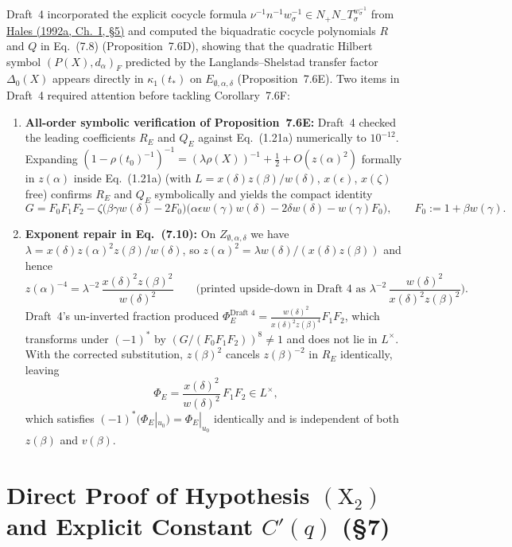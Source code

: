 \documentclass[11pt,letterpaper]{article}
\begin{document}
Draft~4 incorporated the explicit cocycle formula $\nu^{-1}n^{-1}w_\sigma^{-1}\in N_+N_-T_\sigma^{w_\sigma^{-1}}$ from \href{https://iacobus.usc.gal/nde/fulldisplay/alma991013513907807712/34CISUG_USC:NDE/gl}{Hales (1992a, Ch.~I, \S5)} \cite{Ha92a} and computed the biquadratic cocycle polynomials $R$ and $Q$ in Eq.~(7.8) (Proposition~7.6D), showing that the quadratic Hilbert symbol $(P(X),d_\alpha)_F$ predicted by the Langlands--Shelstad transfer factor $\Delta_0(X)$ appears directly in $\kappa_1(t_*)$ on $E_{\emptyset,\alpha,\delta}$ (Proposition~7.6E). Two items in Draft~4 required attention before tackling Corollary~7.6F:
\begin{enumerate}[1.]
\item \textbf{All-order symbolic verification of Proposition~7.6E:} Draft~4 checked the leading coefficients $R_E$ and $Q_E$ against Eq.~(1.21a) numerically to $10^{-12}$. Expanding $(1-\rho(t_0)^{-1})^{-1}=(\lambda\rho(X))^{-1}+\tfrac12+O(z(\alpha)^2)$ formally in $z(\alpha)$ inside Eq.~(1.21a) (with $L=x(\delta)z(\beta)/w(\delta)$, $x(\epsilon)$, $x(\zeta)$ free) confirms $R_E$ and $Q_E$ symbolically and yields the compact identity
\[
G=F_0F_1F_2-\zeta\bigl(\beta\gamma w(\delta)-2F_0\bigr)\bigl(\alpha\epsilon w(\gamma)w(\delta)-2\delta w(\delta)-w(\gamma)F_0\bigr),\qquad F_0:=1+\beta w(\gamma).
\]
\item \textbf{Exponent repair in Eq.~(7.10):} On $Z_{\emptyset,\alpha,\delta}$ we have $\lambda=x(\delta)z(\alpha)^2z(\beta)/w(\delta)$, so $z(\alpha)^2=\lambda w(\delta)/(x(\delta)z(\beta))$ and hence
\[
z(\alpha)^{-4}=\lambda^{-2}\,\frac{x(\delta)^2z(\beta)^2}{w(\delta)^2}
\qquad\text{(printed upside-down in Draft~4 as }\lambda^{-2}\,\frac{w(\delta)^2}{x(\delta)^2z(\beta)^2}\text{)}.
\]
Draft~4's un-inverted fraction produced $\Phi_E^{\text{Draft 4}}=\frac{w(\delta)^2}{x(\delta)^2z(\beta)^4}F_1F_2$, which transforms under $(-1)^*$ by $(G/(F_0F_1F_2))^8\neq 1$ and does not lie in $L^\times$. With the corrected substitution, $z(\beta)^2$ cancels $z(\beta)^{-2}$ in $R_E$ identically, leaving
\[
\Phi_E=\frac{x(\delta)^2}{w(\delta)^2}\,F_1F_2\in L^\times,
\]
which satisfies $(-1)^*(\Phi_E|_{u_0})=\Phi_E|_{u_0}$ identically and is independent of both $z(\beta)$ and $v(\beta)$.
\end{enumerate}

\section{\texorpdfstring{Direct Proof of Hypothesis $(\mathrm{X}_2)$ and Explicit Constant $C'(q)$ (\S7)}{Direct Proof of Hypothesis (X2) and Explicit Constant C'(q) (Section 7)}}
\end{document}
